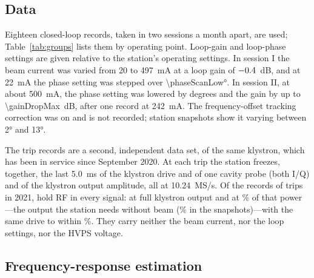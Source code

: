 \subsection{Data}

Eighteen closed-loop records, taken in two sessions a month apart, are used; Table~\ref{tab:groups} lists them by operating point. Loop-gain and loop-phase settings are given relative to the station's operating settings. In session I the beam current was varied from 20 to \SI{497}{mA} at a loop gain of $-0.4$~dB, and at \SI{22}{mA} the phase setting was stepped over \ang{\phaseScanLow}. In session II, at about \SI{500}{mA}, the phase setting was lowered by \phaseShiftsHigh{} degrees and the gain by up to \SI{\gainDropMax}{dB}, after one record at \SI{242}{mA}. The frequency-offset tracking correction was on and is not recorded; station snapshots show it varying between \ang{+2} and \ang{+13}.

The trip records are a second, independent data set, of the same klystron, which has been in service since September 2020. At each trip the station freezes, together, the last \SI{5.0}{ms} of the klystron drive and of one cavity probe (both I/Q) and of the klystron output amplitude, all at \SI{10.24}{MS/s}. Of the \tripN{} records of trips in 2021, \tripUsed{} hold RF in every signal: \tripFull{} at full klystron output and \tripReduced{} at \tripPower\% of that power---the output the station needs without beam (\klyFwdRatio\% in the snapshots)---with the same drive to within \tripDriveDiff\%. They carry neither the beam current, nor the loop settings, nor the HVPS voltage.

\subsection{Frequency-response estimation}\label{sec:estimation}

